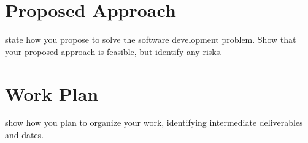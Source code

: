 \documentclass{interim}
\begin{document}
\section{Proposed Approach}

state how you propose to solve the software development problem. Show that your proposed approach is feasible, but identify any risks.

\section{Work Plan}

show how you plan to organize your work, identifying intermediate deliverables and dates.



\end{document}
